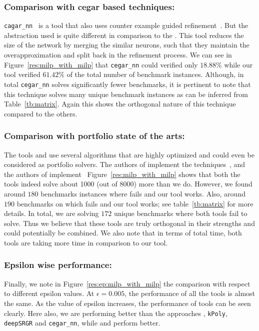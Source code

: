 \subsubsection{Comparison with cegar based techniques: }
\texttt{cagar\_nn}~\cite{elboher2020abstraction} is a tool that also uses  counter example guided refinement~. But the abstraction used is quite different in comparison to the  \deeppoly{}. This tool reduces the size of the network by merging the similar neurons, such that they maintain the overapproximation and split back in the refinement process. We can see in Figure~\ref{res:milp_with_milp} that \texttt{cegar\_nn} could verified only  $18.88\%$ while our tool verified $61.42\%$ of the total number of benchmark instances. Although, in total \texttt{cegar\_nn} solves significantly fewer benchmarks, it is pertinent to note that this technique solves many unique benchmark instances as can be inferred from Table~\ref{tb:matrix}. Again this shows the orthogonal nature of this technique compared to the others.%


\subsubsection{Comparison with portfolio state of the arts: }
The tools \alphabeta{} and \ovaltool{} use several algorithms that are highly optimized and could even be considered as portfolio solvers. The authors of \alphabeta{} implement the techniques~\cite{alphabetapapers}, and the authors of \ovaltool{} implement~\cite{ovalpapers}
Figure~\ref{res:milp_with_milp} shows that both the tools indeed solve about 1000 (out of 8000) more than we do. However, we found around $180$ benchmarks instances where \alphabeta{} fails and our tool works. Also, around $190$ benchmarks on which \ovaltool{} fails and our tool works; see table~\ref{tb:matrix} for more details. In total, we are solving $172$ unique benchmarks where both tools fail to solve. Thus we believe that these tools are truly orthogonal in their strengths and could potentially be combined. We also note that in terms of total time, both tools are taking more time in comparison to our tool. 



\subsubsection{Epsilon wise performance: }
Finally, we note in Figure~\ref{res:ep:milp_with_milp} the comparison with respect to different epsilon values. 
At $\epsilon=0.005$, the performance of all the tools is almost the same. As the value of epsilon increases, the performance of tools can be seen clearly. Here also, we are performing better than the approaches \deeppoly{}, 
\texttt{kPoly}, \texttt{deepSRGR} and \texttt{cegar\_nn}, while \alphabeta{} and \ovaltool{} perform better.

